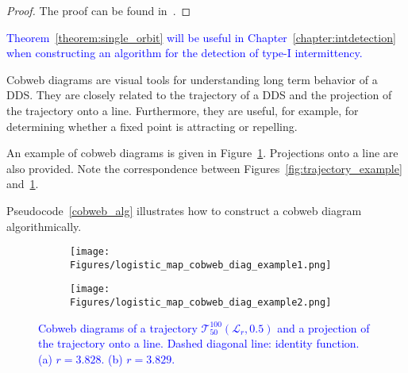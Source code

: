 \begin{proof}
    The proof can be found in~\cite[p.~74]{Devaney20211026}.
\end{proof}

\begin{remark}
\textcolor{blue}{
Theorem~\ref{theorem:single_orbit} will be useful in Chapter~\ref{chapter:intdetection} when constructing an algorithm for the detection of type-I intermittency.
}
\end{remark}

\begin{remark}
\label{def:cobweb}
    Cobweb diagrams are visual tools for understanding long term behavior of a DDS.
    They are closely related to the trajectory of a DDS and the projection of the trajectory onto a line.
    Furthermore, they are useful, for example, for determining whether a fixed point is attracting or repelling.
    \par
    An example of cobweb diagrams is given in Figure~\ref{fig:cobweb_diag_example}.
    Projections onto a line are also provided.
    Note the correspondence between Figures~\ref{fig:trajectory_example} and~\ref{fig:cobweb_diag_example}.
    \par
    Pseudocode~\ref{cobweb_alg} illustrates how to construct a cobweb diagram algorithmically.
\end{remark}

\begin{figure}[!h]
    \centering
    \begin{subfigure}{0.6\textwidth}
        \centering
        \texttt{[image: Figures/logistic\_map\_cobweb\_diag\_example1.png]}
        \caption{}
    \end{subfigure}
    \hfill
    \begin{subfigure}{0.6\textwidth}
        \centering
        \texttt{[image: Figures/logistic\_map\_cobweb\_diag\_example2.png]}
        \caption{}
    \end{subfigure}

    \caption{
        \textcolor{blue}{
        Cobweb diagrams of a trajectory $\mathcal{T}_{50}^{100}(\mathcal{L}_{r}, 0.5)$ and a projection of the trajectory onto a line. 
        Dashed diagonal line: identity function. 
        (a) $r = 3.828$. 
        (b) $r = 3.829$. 
        }
        }
    \label{fig:cobweb_diag_example}
\end{figure}

